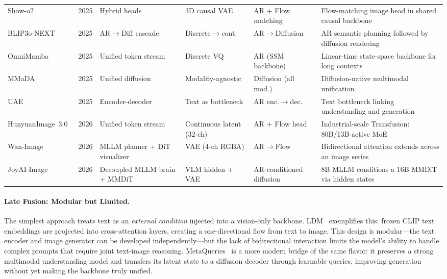 \begin{table}[t]
{\begin{tabular}{@{}l c l l l l@{}}
Show-o2~\citep{xie2025showo2}              & 2025 & Hybrid heads             & 3D causal VAE            & AR + Flow matching    & Flow-matching image head in shared causal backbone \\
BLIP3o-NEXT~\citep{chen2025blip3onext}     & 2025 & AR$\rightarrow$Diff cascade & Discrete$\rightarrow$cont.  & AR$\rightarrow$Diffusion & AR semantic planning followed by diffusion rendering \\
OmniMamba~\citep{zou2025omnimamba}         & 2025 & Unified token stream     & Discrete VQ              & AR (SSM backbone)     & Linear-time state-space backbone for long contexts \\
MMaDA~\citep{yang2025mmada}                & 2025 & Unified diffusion        & Modality-agnostic        & Diffusion (all mod.)  & Diffusion-native multimodal unification \\
UAE~\citep{yan2025uae}                     & 2025 & Encoder-decoder          & Text as bottleneck       & AR enc.$\rightarrow$dec. & Text bottleneck linking understanding and generation \\
HunyuanImage~3.0~\citep{cao2025hunyuanimage} & 2026 & Unified token stream     & Continuous latent (32-ch) & AR + Flow head        & Industrial-scale Transfusion: 80B/13B-active MoE \\
Wan-Image~\citep{mao2026wan}               & 2026 & MLLM planner + DiT visualizer & VAE (4-ch RGBA)     & AR$\rightarrow$Flow      & Bidirectional attention extends across an image series \\
JoyAI-Image~\citep{jdjoyaiimage}           & 2026 & Decoupled MLLM brain + MMDiT & VLM hidden + VAE     & AR-conditioned diffusion & 8B MLLM conditions a 16B MMDiT via hidden states \\
\bottomrule
\end{tabular}%
}
\end{table}

\paragraph{Late Fusion: Modular but Limited.}
The simplest approach treats text as an \emph{external condition} injected into a vision-only backbone. LDM~\citep{rombach2022stablediffusion} exemplifies this: frozen CLIP text embeddings are projected into cross-attention layers, creating a one-directional flow from text to image. This design is modular---the text encoder and image generator can be developed independently---but the lack of bidirectional interaction limits the model's ability to handle complex prompts that require joint text-image reasoning. MetaQueries~\citep{pan2025metaqueries} is a more modern bridge of the same flavor: it preserves a strong multimodal understanding model and transfers its latent state to a diffusion decoder through learnable queries, improving generation without yet making the backbone truly unified.

